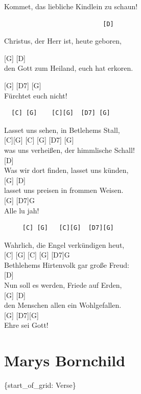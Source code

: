 \documentclass[
  letterpaper,
]{scrbook}
\begin{document}
Kommet, das liebliche Kindlein zu schaun!

\begin{verbatim}
                           [D]
\end{verbatim}

Christus, der Herr ist, heute geboren,

{[}G{]} {[}D{]}\\
den Gott zum Heiland, euch hat erkoren.

{[}G{]} {[}D7{]} {[}G{]}\\
Fürchtet euch nicht!

\begin{verbatim}
  [C] [G]    [C][G]  [D7] [G]
\end{verbatim}

Lasset uns sehen, in Betlehems Stall,\\
{[}C{]}{[}G{]} {[}C{]} {[}G{]} {[}D7{]} {[}G{]}\\
was uns verheißen, der himmlische Schall!\\
{[}D{]}\\
Was wir dort finden, lasset uns künden,\\
{[}G{]} {[}D{]}\\
lasset uns preisen in frommen Weisen.\\
{[}G{]} {[}D7{]}G\\
Alle lu jah!

\begin{verbatim}
     [C] [G]   [C][G]  [D7][G]
\end{verbatim}

Wahrlich, die Engel verkündigen heut,\\
{[}C{]} {[}G{]} {[}C{]} {[}G{]} {[}D7{]}G\\
Bethlehems Hirtenvolk gar große Freud:\\
{[}D{]}\\
Nun soll es werden, Friede auf Erden,\\
{[}G{]} {[}D{]}\\
den Menschen allen ein Wohlgefallen.\\
{[}G{]} {[}D7{]}{[}G{]}\\
Ehre sei Gott!

\hypertarget{marys-bornchild}{%
\chapter{Marys Bornchild}\label{marys-bornchild}}

\{start\_of\_grid: Verse\}
\end{document}
